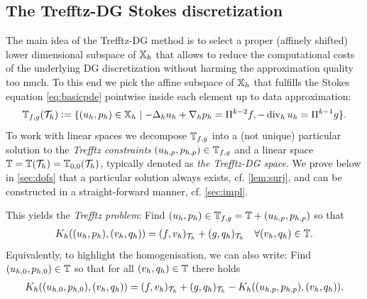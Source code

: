 \documentclass[sn-mathphys,Numbered]{sn-jnl}%
\theoremstyle{remark}%
\theoremstyle{definition}%
\begin{document}
\subsection{The Trefftz-DG Stokes discretization}
The main idea of the Trefftz-DG method is to select a proper (affinely shifted) lower dimensional subspace of $\mathbb{X}_h$ that allows to reduce the computational costs of the underlying DG discretization without harming the approximation quality too much.
To this end we pick the affine subspace of $\mathbb{X}_h$ that fulfills the Stokes equation \eqref{eq:basicpde} pointwise inside each element up to data approximation:
\begin{equation}\label{eq:Trefftzconditions}
  \mathbb{T}_{f,g}({\mathcal{T}_h}) := \{ (u_h,p_h) \in \mathbb{X}_h \mid   -\Delta_h u_{h} + \nabla_h p_{h} = \Pi^{k-2} f, -\operatorname{\mathrm{div}}_h u_{h} = \Pi^{k-1} g \}. 
\end{equation}
To work with linear spaces we decompose $\mathbb{T}_{f,g}$ into a (not unique) particular solution to the \emph{Trefftz constraints} $(u_{h,p},p_{h,p}) \in \mathbb{T}_{f,g}$ and a linear space $\mathbb{T}=\mathbb{T}({\mathcal{T}_h})=\mathbb{T}_{0,0}({\mathcal{T}_h})$, typically denoted as \emph{the Trefftz-DG space}. 
We prove below in \cref{sec:dofs} that a particular solution always exists, cf. \cref{lem:surj}, and can be
constructed in a straight-forward manner, cf. \cref{sec:impl}.



This yields the \emph{Trefftz problem}: Find $(u_h,p_h) \in \mathbb{T}_{f,g} =  \mathbb{T} + (u_{h,p},p_{h,p})$ so that
\begin{align} \label{eq:discreteTrefftz}
  K_h((u_h,p_h),(v_h,q_h)) = (f,v_h)_{{\mathcal{T}_h}} + (g,q_h)_{{\mathcal{T}_h}}\quad \forall (v_h,q_h) \in \mathbb{T}.
\end{align}
Equivalently, to highlight the homogenisation, we can also write:
Find $(u_{h,0},p_{h,0}) \in \mathbb{T}$ so that for all $(v_h,q_h) \in \mathbb{T}$ there holds 
\begin{align} \label{eq:discreteTrefftz0}
  K_h((u_{h,0},p_{h,0}),(v_{h},q_{h})) = (f,v_h)_{{\mathcal{T}_h}} + (g,q_h)_{{\mathcal{T}_h}} - K_h((u_{h,p},p_{h,p}),(v_{h},q_{h})).
\end{align}
\end{document}
